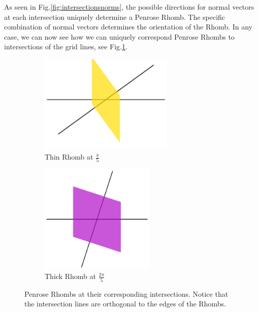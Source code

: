 \documentclass[
  oneside,
  11pt, a4paper,
  footinclude=true,
  headinclude=true,
  cleardoublepage=empty
]{scrbook}
\begin{document}
As seen in Fig.\ref{fig:intersectionsnorms}, the possible directions for normal vectors at each intersection uniquely determine a Penrose Rhomb. The specific combination of normal vectors determines the orientation of the Rhomb. In any case, we can now see how we can uniquely correspond Penrose Rhombs to intersections of the grid lines, see Fig.\ref{fig:rhombsintersections}.

\begin{figure}[H]
\centering
\begin{subfigure}[b]{0.5\textwidth}
\centering
\includegraphics[width=0.7\textwidth]{ThinIntersection}
\caption{Thin Rhomb at $\frac{\pi}{5}$}
\end{subfigure}\hfill
\begin{subfigure}[b]{0.5\textwidth}
\centering
\includegraphics[width=0.6\textwidth]{ThickIntersection}
\caption{Thick Rhomb at $\frac{2\pi}{5}$}
\end{subfigure}
\caption[Rhombs at their Intersections]{Penrose Rhombs at their corresponding intersections. Notice that the intersection lines are orthogonal to the edges of the Rhombs.}
\label{fig:rhombsintersections}
\end{figure}
\end{document}
